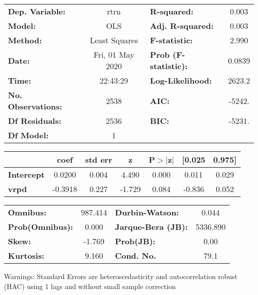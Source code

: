 \begin{center}
\begin{tabular}{lclc}
\toprule
\textbf{Dep. Variable:}    &       rtrn       & \textbf{  R-squared:         } &     0.003   \\
\textbf{Model:}            &       OLS        & \textbf{  Adj. R-squared:    } &     0.003   \\
\textbf{Method:}           &  Least Squares   & \textbf{  F-statistic:       } &     2.990   \\
\textbf{Date:}             & Fri, 01 May 2020 & \textbf{  Prob (F-statistic):} &   0.0839    \\
\textbf{Time:}             &     22:43:29     & \textbf{  Log-Likelihood:    } &    2623.2   \\
\textbf{No. Observations:} &        2538      & \textbf{  AIC:               } &    -5242.   \\
\textbf{Df Residuals:}     &        2536      & \textbf{  BIC:               } &    -5231.   \\
\textbf{Df Model:}         &           1      & \textbf{                     } &             \\
\bottomrule
\end{tabular}
\begin{tabular}{lcccccc}
                   & \textbf{coef} & \textbf{std err} & \textbf{z} & \textbf{P$> |$z$|$} & \textbf{[0.025} & \textbf{0.975]}  \\
\midrule
\textbf{Intercept} &       0.0200  &        0.004     &     4.490  &         0.000        &        0.011    &        0.029     \\
\textbf{vrpd}      &      -0.3918  &        0.227     &    -1.729  &         0.084        &       -0.836    &        0.052     \\
\bottomrule
\end{tabular}
\begin{tabular}{lclc}
\textbf{Omnibus:}       & 987.414 & \textbf{  Durbin-Watson:     } &    0.044  \\
\textbf{Prob(Omnibus):} &   0.000 & \textbf{  Jarque-Bera (JB):  } & 5336.890  \\
\textbf{Skew:}          &  -1.769 & \textbf{  Prob(JB):          } &     0.00  \\
\textbf{Kurtosis:}      &   9.160 & \textbf{  Cond. No.          } &     79.1  \\
\bottomrule
\end{tabular}
\end{center}

Warnings: \newline
 [1] Standard Errors are heteroscedasticity and autocorrelation robust (HAC) using 1 lags and without small sample correction